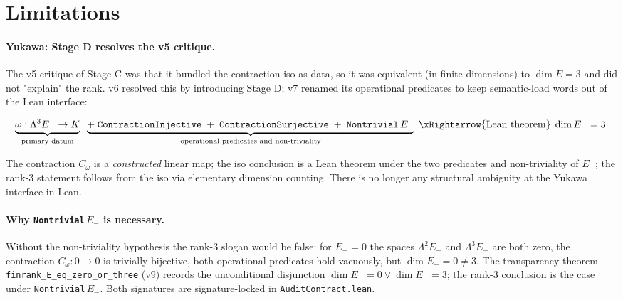 \section{Limitations}
\label{sec:limits}

\paragraph{Yukawa: Stage D resolves the v5 critique.}
The v5 critique of Stage C was that it bundled the contraction
iso as data, so it was equivalent (in finite dimensions) to
$\dim E = 3$ and did not "explain" the rank. v6 resolved this
by introducing Stage D; v7 renamed its operational predicates
to keep semantic-load words out of the Lean interface:

\[
\underbrace{\omega : \Lambda^3 E_- \to K}_{\text{primary datum}}
\;\;
\underbrace{+\;\texttt{ContractionInjective}\;+\;\texttt{ContractionSurjective}\;+\;\texttt{Nontrivial}\,E_-}_{\text{operational predicates and non-triviality}}
\;\xRightarrow{\text{Lean theorem}}\;
\dim E_- = 3.
\]

The contraction $C_\omega$ is a \emph{constructed} linear map;
the iso conclusion is a Lean theorem under the two predicates
and non-triviality of $E_-$; the rank-3 statement follows from
the iso via elementary dimension counting. There is no longer
any structural ambiguity at the Yukawa interface in Lean.

\paragraph{Why \texttt{Nontrivial}\,$E_-$ is necessary.}
Without the non-triviality hypothesis the rank-3 slogan would be
false: for $E_- = 0$ the spaces $\Lambda^2 E_-$ and $\Lambda^3
E_-$ are both zero, the contraction $C_\omega : 0 \to 0$ is
trivially bijective, both operational predicates hold vacuously,
but $\dim E_- = 0 \ne 3$. The transparency theorem
\texttt{finrank\_E\_eq\_zero\_or\_three} (v9) records the
unconditional disjunction $\dim E_- = 0 \lor \dim E_- = 3$;
the rank-3 conclusion is the case under
\texttt{Nontrivial}\,$E_-$. Both signatures are signature-locked
in \texttt{AuditContract.lean}.

